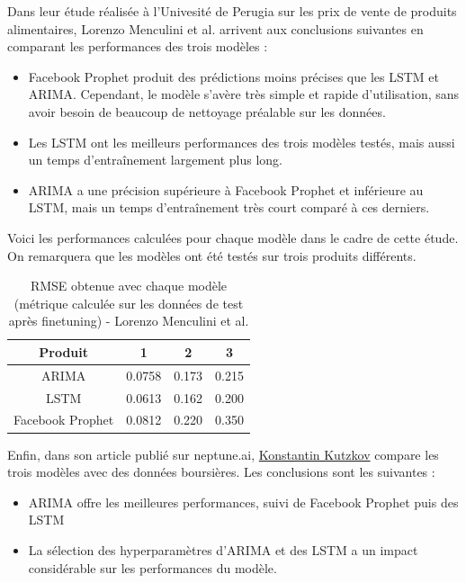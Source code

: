 \documentclass[french]{article}
\begin{document}
    Dans leur étude réalisée à l'Univesité de Perugia sur les prix de vente de produits alimentaires, Lorenzo Menculini et al.\cite{menculini} arrivent aux conclusions suivantes en comparant les performances des trois modèles :
    \begin{itemize}
        \item  Facebook Prophet produit des prédictions moins précises que les LSTM et ARIMA. Cependant, le modèle s'avère très simple et rapide d'utilisation, sans avoir besoin de beaucoup de nettoyage préalable sur les données.
        \item Les LSTM ont les meilleurs performances des trois modèles testés, mais aussi un temps d'entraînement largement plus long.
        \item ARIMA a une précision supérieure à Facebook Prophet et inférieure au LSTM, mais un temps d'entraînement très court comparé à ces derniers.
    \end{itemize}
    Voici les performances calculées pour chaque modèle dans le cadre de cette étude. On remarquera que les modèles ont été testés sur trois produits différents.
    \begin{table}[h!]
        \begin{center}
            \begin{tabular}{ |c| c| c| c| }
                \hline
                Produit & 1 & 2 & 3 \\
                \hline
                ARIMA & 0.0758 & 0.173 & 0.215 \\ 
                \hline
                LSTM & 0.0613 & 0.162 & 0.200 \\  
                \hline
                Facebook Prophet & 0.0812 & 0.220 & 0.350 \\
                \hline
            \end{tabular}
            \caption{RMSE obtenue avec chaque modèle (métrique calculée sur les données de test après finetuning) - Lorenzo Menculini et al.}
            \label{table:1}
        \end{center}
    \end{table}
    
    Enfin, dans son article publié sur neptune.ai\cite{neptune}, \href{https://www.linkedin.com/in/konstantin-kutzkov-%F0%9F%87%BA%F0%9F%87%A6-10a98667/?originalSubdomain=bg}{Konstantin Kutzkov} compare les trois modèles avec des données boursières. Les conclusions sont les suivantes :
    \begin{itemize}
        \item ARIMA offre les meilleures performances, suivi de Facebook Prophet puis des LSTM
        \item La sélection des hyperparamètres d'ARIMA et des LSTM a un impact considérable sur les performances du modèle.
    \end{itemize}
\end{document}
